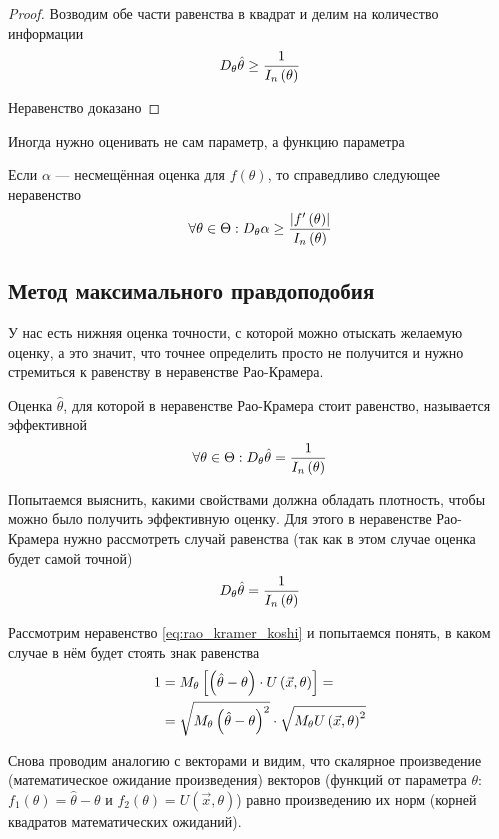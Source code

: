 \begin{proof}
    Возводим обе части равенства в квадрат и делим на количество информации
    $$D_{\theta} \hat{\theta}\ge \frac{1}{I_n\left(\theta\right)}$$

    Неравенство доказано
\end{proof}
\begin{remark}
    Иногда нужно оценивать не сам параметр, а функцию параметра
\end{remark}

Если $\alpha$ --- несмещённая оценка для $f\left(\theta\right)$,
то справедливо следующее неравенство
$$\forall\theta\in\Theta:D_{\theta} \alpha
    \ge\frac{\left|f'\left(\theta\right)\right|}{I_n\left(\theta\right)}$$

\subsection{Метод максимального правдоподобия}
У нас есть нижняя оценка точности,
с которой можно отыскать желаемую оценку, а это значит,
что точнее определить просто не получится
и нужно стремиться к равенству в неравенстве Рао-Крамера.

\begin{definition}
    Оценка $\hat{\theta}$,
    для которой в неравенстве Рао-Крамера стоит равенство,
    называется эффективной
    $$\forall\theta\in\Theta:
        D_{\theta} \hat{\theta}=\frac{1}{I_n\left(\theta\right)}$$
\end{definition}

Попытаемся выяснить, какими свойствами должна обладать плотность,
чтобы можно было получить эффективную оценку.
Для этого в неравенстве Рао-Крамера нужно рассмотреть случай равенства
(так как в этом случае оценка будет самой точной)
    $$D_{\theta} \hat{\theta}=\frac{1}{I_n\left(\theta\right)}$$

Рассмотрим неравенство \eqref{eq:rao_kramer_koshi} и попытаемся понять,
в каком случае в нём будет стоять знак равенства
\begin{align*}
    1&=M_{\theta} 
        \left[\left(\hat{\theta}-\theta\right)
            \cdot U\left( \vec{x},\theta \right)\right]=\\
    &=\sqrt{M_{\theta} 
        \left(\hat{\theta}-\theta\right)^2}
        \cdot\sqrt{M_{\theta} U\left( \vec{x},\theta \right)^2}
\end{align*}

Снова проводим аналогию с векторами и видим,
что скалярное произведение (математическое ожидание произведения)
векторов
(функций от параметра $\theta$:
$f_1\left( \theta \right)=\hat{\theta}-\theta$ и
$f_2\left( \theta \right)=U\left( \vec{x},\theta \right)$)
равно произведению их норм (корней квадратов математических ожиданий).

